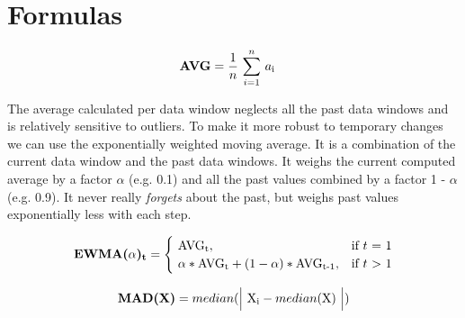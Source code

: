 \section{Formulas}
\label{sec:formulas}

\begin{align}
	\textbf{AVG} ={}& \dfrac{1}{n} \, \sum_{i=1}^{n} \, a\textsubscript{i}
	\label{eq:formulas:average}
\end{align}

The average calculated per data window neglects all the past data windows and is relatively sensitive to outliers.
To make it more robust to temporary changes we can use the exponentially weighted moving average.
It is a combination of the current data window and the past data windows.
It weighs the current computed average by a factor $\alpha$ (e.g. 0.1) and all the past values combined by a factor 1 - $\alpha$ (e.g. 0.9).
It never really \textit{forgets} about the past, but weighs past values exponentially less with each step.

\begin{align}
    \textbf{EWMA($\alpha$)\textsubscript{t}} = 
	\begin{cases} 
		\ \mbox{AVG}\textsubscript{t}, & \mbox{if } t\mbox{ = 1} \\ 
		\ \alpha * \mbox{AVG}\textsubscript{t} + (1 - \alpha) * \mbox{AVG}\textsubscript{t-1} , & \mbox{if } t\mbox{ $>$ 1}
	\end{cases}
	\label{eq:formulas:moving_average}
\end{align}

\begin{align}
	\textbf{MAD(X)} = median(\Bigl| \ \mbox{X\textsubscript{i}} - median(\mbox{X}) \ \Bigl|)
	\label{eq:formulas:mad}
\end{align}

